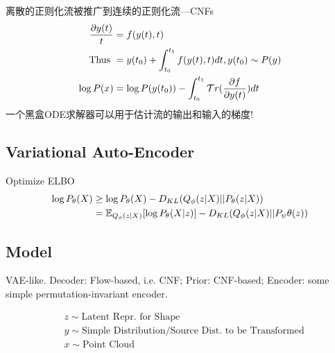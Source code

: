 \documentclass{article}
\begin{document}
    离散的正则化流被推广到连续的正则化流---CNFs
    \begin{align}
        \frac{\partial y(t)}{t} &= f(y(t), t)\\
        \text{Thus } &=y(t_0) + \int^{t_1}_{t_0}f(y(t),t)dt, y(t_0) \sim P(y)\\
        \log P(x) &= \log P(y(t_0)) - \int^{t_1}_{t_0}\cal Tr(\frac{\partial f}{\partial y(t)})dt 
    \end{align}
    一个黑盒ODE求解器可以用于估计流的输出和输入的梯度!

\subsection{Variational Auto-Encoder}

    Optimize ELBO
    \begin{align}
        \log P_\theta(X) & \ge \log P_\theta(X) - D_{KL}(Q_\phi(z|X)||P_\theta(z|X))\\
        &= \bb E_{Q_\phi(z|X)}[\log P_\theta(X|z)]- D_{KL}(Q_\phi(z|X)||P_\psi \theta(z))
    \end{align}

\subsection{Model}


     VAE-like. Decoder: Flow-based, i.e. CNF; Prior: CNF-based; Encoder: some simple permutation-invariant encoder.

    \begin{align}
        &z \sim \text{Latent Repr. for Shape}\\
        &y \sim \text{Simple Distribution/Source Dist. to be Transformed}\\
        &x \sim \text{Point Cloud}\\
    \end{align}
\end{document}
